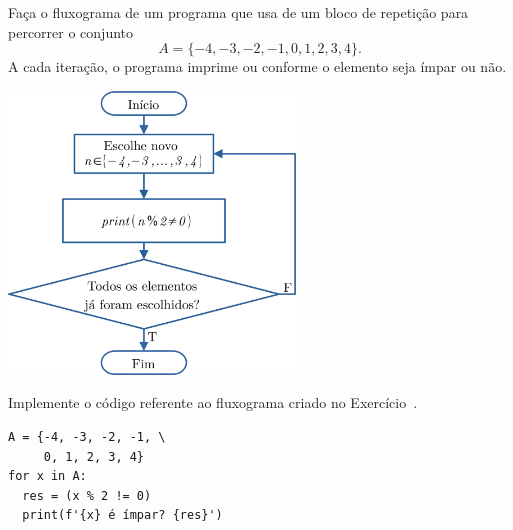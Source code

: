 \begin{exer}\label{cap_progest_sec_est:exer:for}
  Faça o fluxograma de um programa que usa de um bloco de repetição {\PYTHONfor} para percorrer o conjunto
  \begin{equation}
    A = \{-4, -3, -2, -1, 0, 1, 2, 3, 4\}.
  \end{equation}
  A cada iteração, o programa imprime {\PYTHONTrue} ou {\PYTHONFalse} conforme o elemento seja ímpar ou não.
\end{exer}
\begin{resp}
  
  \includegraphics[width=3in]{cap_progest/dados/fig_exer_for/fig.png}

\end{resp}

\begin{exer}
  Implemente o código referente ao fluxograma criado no Exercício~.
\end{exer}
\begin{resp}

\begin{lstlisting}
A = {-4, -3, -2, -1, \
     0, 1, 2, 3, 4}
for x in A:
  res = (x % 2 != 0)
  print(f'{x} é ímpar? {res}')
\end{lstlisting}

\end{resp}

